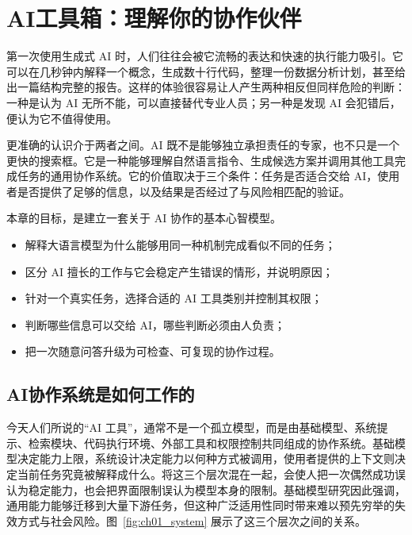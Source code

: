 ﻿\chapter{AI工具箱：理解你的协作伙伴}

第一次使用生成式 AI 时，人们往往会被它流畅的表达和快速的执行能力吸引。它可以在几秒钟内解释一个概念，生成数十行代码，整理一份数据分析计划，甚至给出一篇结构完整的报告。这样的体验很容易让人产生两种相反但同样危险的判断：一种是认为 AI 无所不能，可以直接替代专业人员；另一种是发现 AI 会犯错后，便认为它不值得使用。

更准确的认识介于两者之间。AI 既不是能够独立承担责任的专家，也不只是一个更快的搜索框。它是一种能够理解自然语言指令、生成候选方案并调用其他工具完成任务的通用协作系统。它的价值取决于三个条件：任务是否适合交给 AI，使用者是否提供了足够的信息，以及结果是否经过了与风险相匹配的验证。

本章的目标，是建立一套关于 AI 协作的基本心智模型。

\begin{chapterguide}
\begin{itemize}
  \item 解释大语言模型为什么能够用同一种机制完成看似不同的任务；
  \item 区分 AI 擅长的工作与它会稳定产生错误的情形，并说明原因；
  \item 针对一个真实任务，选择合适的 AI 工具类别并控制其权限；
  \item 判断哪些信息可以交给 AI，哪些判断必须由人负责；
  \item 把一次随意问答升级为可检查、可复现的协作过程。
\end{itemize}
\end{chapterguide}

\section{AI协作系统是如何工作的}

今天人们所说的“AI 工具”，通常不是一个孤立模型，而是由基础模型、系统提示、检索模块、代码执行环境、外部工具和权限控制共同组成的协作系统。基础模型决定能力上限，系统设计决定能力以何种方式被调用，使用者提供的上下文则决定当前任务究竟被解释成什么。将这三个层次混在一起，会使人把一次偶然成功误认为稳定能力，也会把界面限制误认为模型本身的限制。基础模型研究因此强调，通用能力能够迁移到大量下游任务，但这种广泛适用性同时带来难以预先穷举的失效方式与社会风险\cite{bommasani2021opportunities}。图~\ref{fig:ch01_system} 展示了这三个层次之间的关系。

